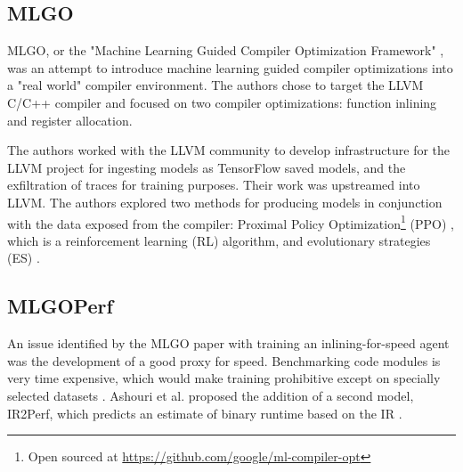 \documentclass[nohyperref]{article}
\theoremstyle{plain}
\theoremstyle{definition}
\theoremstyle{remark}
\begin{document}
\subsection{MLGO}
MLGO, or the "Machine Learning Guided Compiler Optimization Framework" \cite{mlgo}, was an attempt to introduce machine learning guided compiler optimizations into a "real world" compiler environment. The authors chose to target the LLVM C/C++ compiler and focused on two compiler optimizations: function inlining and register allocation.

The authors worked with the LLVM community to develop infrastructure for the LLVM project for ingesting models as TensorFlow saved models, and the exfiltration of traces for training purposes. Their work was upstreamed into LLVM. The authors explored two methods for producing models in conjunction with the data exposed from the compiler: Proximal Policy Optimization\footnote{Open sourced at \href{https://github.com/google/ml-compiler-opt}{https://github.com/google/ml-compiler-opt}} (PPO) \cite{schulman2017proximal}, which is a reinforcement learning (RL) algorithm, and evolutionary strategies (ES) \cite{salimans2017evolution}.




\subsection{MLGOPerf}
An issue identified by the MLGO paper with training an inlining-for-speed agent was the development of a good proxy for speed. Benchmarking code modules is very time expensive, which would make training prohibitive except on specially selected datasets \cite{mlgo}. Ashouri et al. proposed the addition of a second model, IR2Perf, which predicts an estimate of binary runtime based on the IR \cite{mlgoperf}.
\end{document}
